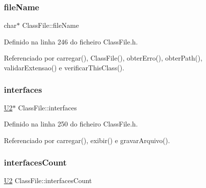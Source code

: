 \mbox{\label{classClassFile_a2789cf19be5abaeadf96f83de33174a4}} 
\subsubsection{\texorpdfstring{file\+Name}{fileName}}
{\footnotesize\ttfamily char$\ast$ Class\+File\+::file\+Name\hspace{0.3cm}{\ttfamily [private]}}



Definido na linha 246 do ficheiro Class\+File.\+h.



Referenciado por carregar(), Class\+File(), obter\+Erro(), obter\+Path(), validar\+Extensao() e verificar\+This\+Class().

\mbox{\label{classClassFile_a94d1e4e835476f47e3a8b81ecd0301c0}} 
\subsubsection{\texorpdfstring{interfaces}{interfaces}}
{\footnotesize\ttfamily \hyperlink{BasicTypes_8h_a90240657108b1b457eef9d3f76e0202e}{U2}$\ast$ Class\+File\+::interfaces\hspace{0.3cm}{\ttfamily [private]}}



Definido na linha 250 do ficheiro Class\+File.\+h.



Referenciado por carregar(), exibir() e gravar\+Arquivo().

\mbox{\label{classClassFile_a1bbca13f93ec21beffa8a56e360c9f8d}} 
\subsubsection{\texorpdfstring{interfaces\+Count}{interfacesCount}}
{\footnotesize\ttfamily \hyperlink{BasicTypes_8h_a90240657108b1b457eef9d3f76e0202e}{U2} Class\+File\+::interfaces\+Count\hspace{0.3cm}{\ttfamily [private]}}



